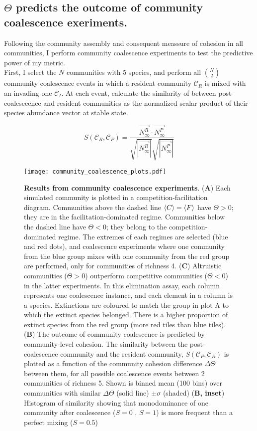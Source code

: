 \documentclass[titlepage,11pt]{article}
\begin{document}
\begin{linenumbers}
			\subsection{$ \Theta $ predicts the outcome of community coalescence exeriments.}
			Following the community assembly and consequent meassure of cohesion in all communities, I perform community coalescence experiments to test the predictive power of my metric.\\
			First, I select the $ N $ communities with 5 species, and perform all $ {N}\choose{2} $ community coalescence events in which a resident community $\mathcal{C}_R$ is mixed with an invading one $ \mathcal{C}_I $. At each event, calculate the similarity of between post-coalesecence  and resident communities as the normalized scalar product of their species abundance vector at stable state.
			\begin{linenomath*}
				\begin{equation}
				S(\mathcal{C}_R, \mathcal{C}_P) = \frac{\vec{N^R_{\infty}} \cdot \vec{N^P_{\infty}}}{\sqrt{|\vec{N^R_{\infty}}|}\sqrt{|\vec{N^P_{\infty}}|}}
				\end{equation}
			\end{linenomath*}
			\begin{figure}
				\centering			
				\texttt{[image: community\_coalescence\_plots.pdf]}
				\caption{\textbf{Results from community coalescence experiments}. (\textbf{A}) Each simulated community is plotted in a competition-facilitation diagram. Communities above the dashed line $ \braket{C} = \braket{F} $ have $ \Theta > 0 $; they are in the facilitation-dominated regime. Communities below the dashed line have $ \Theta <0 $; they belong to the competition-dominated regime. The extremes of each regimes are selected (blue and red dots), and coalescence experiments where one community from the blue group mixes with one community from the red group are performed, only for communities of richness 4. (\textbf{C}) Altruistic communities ($ \Theta > 0 $) outperform competitive communities ($ \Theta < 0 $) in the latter experiments. In this elimination assay, each column represents one coalescence instance, and each element in a column is a species. Extinctions are coloured to match the group in plot A to which the extinct species belonged. There is a higher proportion of extinct species from the red group (more red tiles than blue tiles). (\textbf{B}) The outcome of community coalescence is predicted by community-level cohesion. The similarity between the post-coalescence community and the resident community, $ S (\mathcal{C}_P, \mathcal{C}_R) $ is plotted as a function of the community cohesion difference $ \Delta \Theta $ between them, for all possible coalescence events between 2 communities of richness 5. Shown is binned mean (100 bins) over communities with similar $ \Delta \Theta $ (solid line) $ \pm \sigma $ (shaded) (\textbf{B, inset}) Histogram of similarity showing that monodominance of one community after coalescence  ($ S = 0 \text{ , } S = 1 $) is more frequent than a perfect mixing ($ S = 0.5 $) }
				\label{fig:community_coalescence_results}
		\end{figure}
			

\end{linenumbers}
\end{document}
